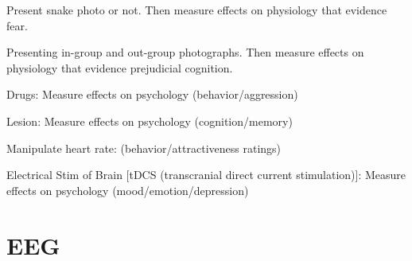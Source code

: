 \begin{coloredlist}
    \item Present snake photo or not. Then measure effects on physiology that evidence fear.
    \item Presenting in-group and out-group photographs. Then measure effects on physiology that evidence prejudicial cognition.
    \item Drugs: Measure effects on psychology (behavior/aggression)
    \item Lesion: Measure effects on psychology (cognition/memory)
    \item Manipulate heart rate: (behavior/attractiveness ratings)
    \item Electrical Stim of Brain [tDCS (transcranial direct current stimulation)]: Measure effects on psychology (mood/emotion/depression)
\end{coloredlist}

\section*{EEG}

